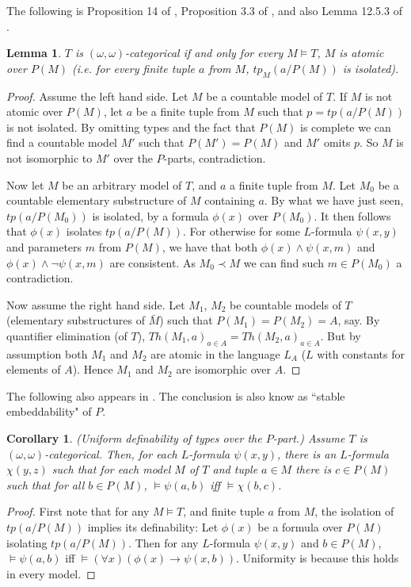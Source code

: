 \documentclass[12pt]{article}
\newtheorem{Lemma}[Theorem]{Lemma}
\newtheorem{Corollary}[Theorem]{Corollary}
\begin{document}
The following is Proposition 14 of \cite{Pillay-omega-categoricity},  Proposition 3.3 of \cite{HHM}, and also Lemma 12.5.3 of \cite{Hodges-book}. 
\begin{Lemma} $T$ is  $(\omega, \omega)$-categorical if and only for every $M\models T$, $M$ is atomic over $P(M)$ (i.e. for every finite tuple $a$ from $M$, $tp_{M}(a/P(M))$ is isolated). 
\end{Lemma}
\begin{proof}  Assume the left hand side. Let $M$ be a countable model of $T$.  If $M$ is not atomic over $P(M)$, let $a$ be a finite tuple from $M$ such that $p = tp(a/P(M))$ is not isolated. By omitting types and the fact that $P(M)$ is complete we can find a countable model $M'$ such that $P(M') = P(M)$ and $M'$ omits $p$. So $M$ is not isomorphic to $M'$ over the $P$-parts, contradiction.

Now let $M$ be an arbitrary model of $T$, and $a$ a finite tuple from $M$. Let $M_{0}$ be a countable elementary substructure of  $M$ containing $a$. By what we have just seen, $tp(a/P(M_{0}))$ is isolated, by a formula $\phi(x)$ over $P(M_{0})$. It then follows that $\phi(x)$ isolates $tp(a/P(M))$. For otherwise for some $L$-formula $\psi(x,y)$ and parameters $m$ from $P(M)$, we have that both $\phi(x)\wedge \psi(x,m)$ and $\phi(x)\wedge\neg\psi(x,m)$ are consistent.
As $M_{0}\prec M$ we can find such $m\in P(M_{0})$ a contradiction.

Now assume the right hand side. Let $M_{1}$, $M_{2}$ be countable models of $T$ (elementary substructures of $\bar M$) such that $P(M_{1}) = P(M_{2}) = A$, say. By quantifier elimination (of $T$), $Th(M_{1},a)_{a\in A} = Th(M_{2}, a)_{a\in A}$. But by assumption both $M_{1}$ and $M_{2}$ are atomic in the language $L_{A}$ ($L$ with constants for elements of $A$). Hence $M_{1}$ and $M_{2}$ are isomorphic over $A$. 

\end{proof} 

The following also appears in \cite{Pillay-omega-categoricity}. The conclusion is also know as ``stable embeddability" of $P$. 

\begin{Corollary} (Uniform definability of types over the $P$-part.) Assume $T$ is  $(\omega, \omega)$-categorical. Then, for each $L$-formula $\psi(x,y)$, there is an $L$-formula $\chi(y,z)$ such that for each model $M$ of $T$ and tuple $a\in M$ there is 
$c\in P(M)$ such that for all $b\in P(M)$, $\models \psi(a,b)$ iff $\models \chi(b,c)$. 
\end{Corollary}
\begin{proof} First note that for any $M\models T$, and finite tuple $a$ from $M$, the isolation of $tp(a/P(M))$ implies its definability: Let $\phi(x)$ be a formula over $P(M)$ isolating $tp(a/P(M))$. Then for
any $L$-formula  $\psi(x,y)$ and $b\in P(M)$, $\models\psi(a,b)$ iff $\models (\forall x)(\phi(x) \to \psi(x,b))$.
Uniformity is because this holds in every model.
\end{proof} 
\end{document}
